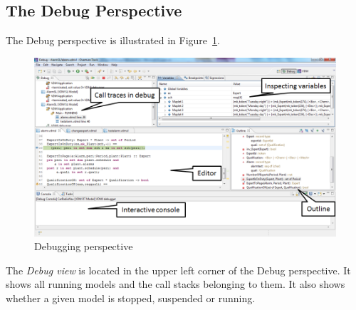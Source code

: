 \subsection{The Debug Perspective}
The Debug perspective is illustrated in Figure~\ref{fig:DebuggingVDM}.
%
\begin{figure}[htp]
\begin{center}
  \includegraphics[width=4.5in]{figures/DebuggingVDM}
  \caption[Debugging perspective]{Debugging perspective}
  \label{fig:DebuggingVDM}
\end{center}
\end{figure}
%
The \emph{Debug view} is located in the upper left corner of the Debug perspective. It shows all running models and the call stacks belonging to them. It also shows whether a given model is stopped, suspended or running. 
%
